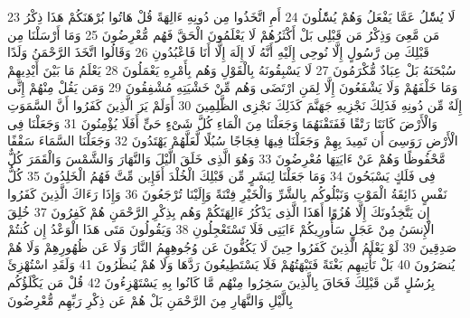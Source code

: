 \documentclass[20pt,a4paper]{article}
\begin{document}
{\tiny\colorbox{cl_aya}{23}} لَا يُسَْٔلُ عَمَّا يَفْعَلُ وَهُمْ يُسَْٔلُونَ
{\tiny\colorbox{cl_aya}{24}} أَمِ اتَّخَذُوا مِن دُونِهِ ءَالِهَةً قُلْ هَاتُوا بُرْهَنَكُمْ هَذَا ذِكْرُ مَن مَّعِىَ وَذِكْرُ مَن قَبْلِى بَلْ أَكْثَرُهُمْ لَا يَعْلَمُونَ الْحَقَّ فَهُم مُّعْرِضُونَ
{\tiny\colorbox{cl_aya}{25}} وَمَا أَرْسَلْنَا مِن قَبْلِكَ مِن رَّسُولٍ إِلَّا نُوحِى إِلَيْهِ أَنَّهُ لَا إِلَهَ إِلَّا أَنَا فَاعْبُدُونِ
{\tiny\colorbox{cl_aya}{26}} وَقَالُوا اتَّخَذَ الرَّحْمَنُ وَلَدًا سُبْحَنَهُ بَلْ عِبَادٌ مُّكْرَمُونَ
{\tiny\colorbox{cl_aya}{27}} لَا يَسْبِقُونَهُ بِالْقَوْلِ وَهُم بِأَمْرِهِ يَعْمَلُونَ
{\tiny\colorbox{cl_aya}{28}} يَعْلَمُ مَا بَيْنَ أَيْدِيهِمْ وَمَا خَلْفَهُمْ وَلَا يَشْفَعُونَ إِلَّا لِمَنِ ارْتَضَى وَهُم مِّنْ خَشْيَتِهِ مُشْفِقُونَ
{\tiny\colorbox{cl_aya}{29}} وَمَن يَقُلْ مِنْهُمْ إِنِّى إِلَهٌ مِّن دُونِهِ فَذَلِكَ نَجْزِيهِ جَهَنَّمَ كَذَلِكَ نَجْزِى الظَّلِمِينَ
{\tiny\colorbox{cl_aya}{30}} أَوَلَمْ يَرَ الَّذِينَ كَفَرُوا أَنَّ السَّمَوَتِ وَالْأَرْضَ كَانَتَا رَتْقًا فَفَتَقْنَهُمَا وَجَعَلْنَا مِنَ الْمَاءِ كُلَّ شَىْءٍ حَىٍّ أَفَلَا يُؤْمِنُونَ
{\tiny\colorbox{cl_aya}{31}} وَجَعَلْنَا فِى الْأَرْضِ رَوَسِىَ أَن تَمِيدَ بِهِمْ وَجَعَلْنَا فِيهَا فِجَاجًا سُبُلًا لَّعَلَّهُمْ يَهْتَدُونَ
{\tiny\colorbox{cl_aya}{32}} وَجَعَلْنَا السَّمَاءَ سَقْفًا مَّحْفُوظًا وَهُمْ عَنْ ءَايَتِهَا مُعْرِضُونَ
{\tiny\colorbox{cl_aya}{33}} وَهُوَ الَّذِى خَلَقَ الَّيْلَ وَالنَّهَارَ وَالشَّمْسَ وَالْقَمَرَ كُلٌّ فِى فَلَكٍ يَسْبَحُونَ
{\tiny\colorbox{cl_aya}{34}} وَمَا جَعَلْنَا لِبَشَرٍ مِّن قَبْلِكَ الْخُلْدَ أَفَإِين مِّتَّ فَهُمُ الْخَلِدُونَ
{\tiny\colorbox{cl_aya}{35}} كُلُّ نَفْسٍ ذَائِقَةُ الْمَوْتِ وَنَبْلُوكُم بِالشَّرِّ وَالْخَيْرِ فِتْنَةً وَإِلَيْنَا تُرْجَعُونَ
{\tiny\colorbox{cl_aya}{36}} وَإِذَا رَءَاكَ الَّذِينَ كَفَرُوا إِن يَتَّخِذُونَكَ إِلَّا هُزُوًا أَهَذَا الَّذِى يَذْكُرُ ءَالِهَتَكُمْ وَهُم بِذِكْرِ الرَّحْمَنِ هُمْ كَفِرُونَ
{\tiny\colorbox{cl_aya}{37}} خُلِقَ الْإِنسَنُ مِنْ عَجَلٍ سَأُورِيكُمْ ءَايَتِى فَلَا تَسْتَعْجِلُونِ
{\tiny\colorbox{cl_aya}{38}} وَيَقُولُونَ مَتَى هَذَا الْوَعْدُ إِن كُنتُمْ صَدِقِينَ
{\tiny\colorbox{cl_aya}{39}} لَوْ يَعْلَمُ الَّذِينَ كَفَرُوا حِينَ لَا يَكُفُّونَ عَن وُجُوهِهِمُ النَّارَ وَلَا عَن ظُهُورِهِمْ وَلَا هُمْ يُنصَرُونَ
{\tiny\colorbox{cl_aya}{40}} بَلْ تَأْتِيهِم بَغْتَةً فَتَبْهَتُهُمْ فَلَا يَسْتَطِيعُونَ رَدَّهَا وَلَا هُمْ يُنظَرُونَ
{\tiny\colorbox{cl_aya}{41}} وَلَقَدِ اسْتُهْزِئَ بِرُسُلٍ مِّن قَبْلِكَ فَحَاقَ بِالَّذِينَ سَخِرُوا مِنْهُم مَّا كَانُوا بِهِ يَسْتَهْزِءُونَ
{\tiny\colorbox{cl_aya}{42}} قُلْ مَن يَكْلَؤُكُم بِالَّيْلِ وَالنَّهَارِ مِنَ الرَّحْمَنِ بَلْ هُمْ عَن ذِكْرِ رَبِّهِم مُّعْرِضُونَ
\end{document}
